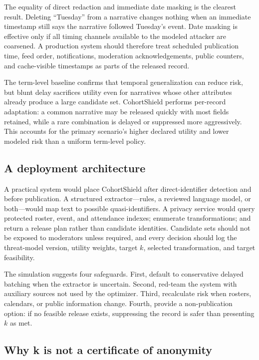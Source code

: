 \documentclass[pdflatex,sn-mathphys-num]{sn-jnl}
\theoremstyle{plain}
\begin{document}
The equality of direct redaction and immediate date masking is the clearest result. Deleting ``Tuesday'' from a narrative changes nothing when an immediate timestamp still says the narrative followed Tuesday's event. Date masking is effective only if all timing channels available to the modeled attacker are coarsened. A production system should therefore treat scheduled publication time, feed order, notifications, moderation acknowledgements, public counters, and cache-visible timestamps as parts of the released record.

The term-level baseline confirms that temporal generalization can reduce risk, but blunt delay sacrifices utility even for narratives whose other attributes already produce a large candidate set. CohortShield performs per-record adaptation: a common narrative may be released quickly with most fields retained, while a rare combination is delayed or suppressed more aggressively. This accounts for the primary scenario's higher declared utility and lower modeled risk than a uniform term-level policy.

\subsection{A deployment architecture}

A practical system would place CohortShield after direct-identifier detection and before publication. A structured extractor---rules, a reviewed language model, or both---would map text to possible quasi-identifiers. A privacy service would query protected roster, event, and attendance indexes; enumerate transformations; and return a release plan rather than candidate identities. Candidate sets should not be exposed to moderators unless required, and every decision should log the threat-model version, utility weights, target $k$, selected transformation, and target feasibility.

The simulation suggests four safeguards. First, default to conservative delayed batching when the extractor is uncertain. Second, red-team the system with auxiliary sources not used by the optimizer. Third, recalculate risk when rosters, calendars, or public information change. Fourth, provide a non-publication option: if no feasible release exists, suppressing the record is safer than presenting $k$ as met.

\subsection{Why k is not a certificate of anonymity}
\end{document}
